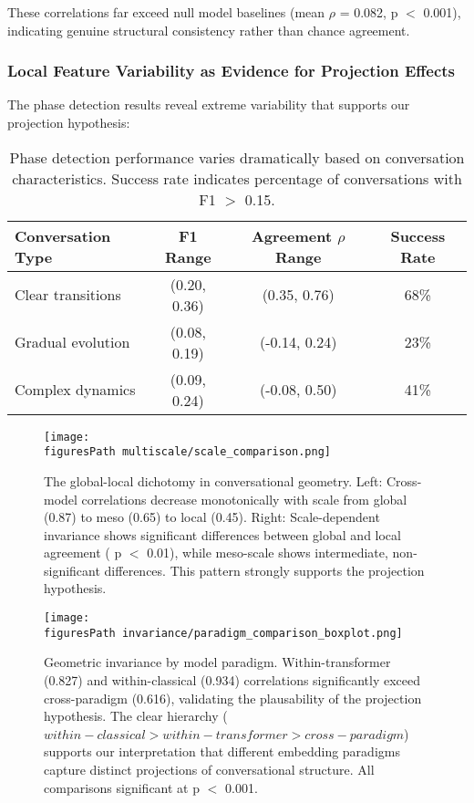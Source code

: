 \documentclass[11pt,letterpaper]{article}
\newcommand{\nullModelPValue}{0.001}
\newcommand{\nullBaselineCorr}{0.082}
\newcommand{\figuresPath}{../analysis/analysis_output/figures/}
\begin{document}
These correlations far exceed null model baselines (mean $\rho$ = \nullBaselineCorr{}, p $<$ \nullModelPValue{}), indicating genuine structural consistency rather than chance agreement.

\subsubsection{Local Feature Variability as Evidence for Projection Effects}

The phase detection results reveal extreme variability that supports our projection hypothesis:

\begin{table}[h]
\centering
\begin{tabular}{lccc}
\toprule
Conversation Type & F1 Range & Agreement $\rho$ Range & Success Rate \\
\midrule
Clear transitions & (0.20, 0.36) & (0.35, 0.76) & 68\% \\
Gradual evolution & (0.08, 0.19) & (-0.14, 0.24) & 23\% \\
Complex dynamics & (0.09, 0.24) & (-0.08, 0.50) & 41\% \\
\bottomrule
\end{tabular}
\caption{Phase detection performance varies dramatically based on conversation characteristics. Success rate indicates percentage of conversations with F1 $>$ 0.15.}
\label{tab:phase_performance}
\end{table}

\begin{figure}[H]
\centering
\texttt{[image: \\figuresPath multiscale/scale\_comparison.png]}
\caption{The global-local dichotomy in conversational geometry. Left: Cross-model correlations decrease monotonically with scale from global (0.87) to meso (0.65) to local (0.45). Right: Scale-dependent invariance shows significant differences between global and local agreement ( p $<$ 0.01), while meso-scale shows intermediate, non-significant differences. This pattern strongly supports the projection hypothesis.}
\label{fig:dichotomy}
\end{figure}

\begin{figure}[H]
\centering
\texttt{[image: \\figuresPath invariance/paradigm\_comparison\_boxplot.png]}
\caption{Geometric invariance by model paradigm. Within-transformer (0.827) and within-classical (0.934) correlations significantly exceed cross-paradigm (0.616), validating the plausability of the projection hypothesis. The clear hierarchy ($within-classical > within-transformer > cross-paradigm$) supports our interpretation that different embedding paradigms capture distinct projections of conversational structure. All comparisons significant at p $<$ 0.001.}
\label{fig:paradigm}
\end{figure}
\end{document}
